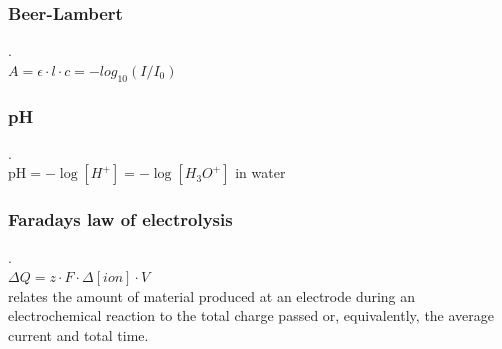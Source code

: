 \documentclass[9pt]{article}
\begin{document}
\begin{multicols}{2}
\subsubsection{Beer-Lambert}.\\
$A=\epsilon\cdot l\cdot c=-log_{10}(I/I_0)$
\subsubsection{pH}.\\
pH$= -\log [H^+] =-\log [H_3 O^+] $ in water
\subsubsection{Faradays law of electrolysis}.\\
$\Delta Q= z\cdot F\cdot \Delta [ion]\cdot V$\\
relates the amount of material produced at an electrode during an electrochemical reaction to the total charge passed or, equivalently, the average current and total time.

\end{multicols}
\end{document}
